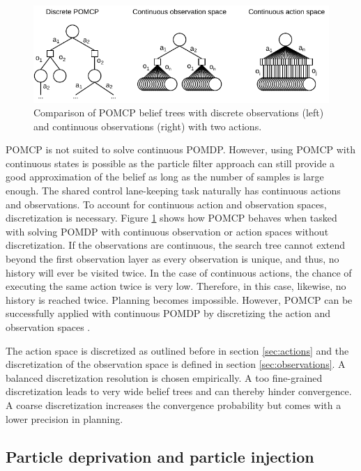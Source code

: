 \begin{figure}[htbp]
    \centering
    \includegraphics[width=1.0\textwidth]{figures/pomcp_continuous.pdf}
    \caption[Comparison of POMCP belief trees with discrete observations and continuous observations]{Comparison of POMCP belief trees with discrete observations (left) and continuous observations (right) with two actions.}
    \label{fig:pomcp_cont}
\end{figure}

POMCP is not suited to solve continuous POMDP. However, using POMCP with continuous states is possible as the particle filter approach can still provide a good approximation of the belief as long as the number of samples is large enough. The shared control lane-keeping task naturally has continuous actions and observations. To account for continuous action and observation spaces, discretization is necessary. Figure \ref{fig:pomcp_cont} shows how POMCP behaves when tasked with solving POMDP with continuous observation or action spaces without discretization. If the observations are continuous, the search tree cannot extend beyond the first observation layer as every observation is unique, and thus, no history will ever be visited twice. In the case of continuous actions, the chance of executing the same action twice is very low. Therefore, in this case, likewise, no history is reached twice. Planning becomes impossible. However, POMCP can be successfully applied with continuous POMDP by discretizing the action and observation spaces \parencite{pomcp_continuous}.

The action space is discretized as outlined before in section \ref{sec:actions} and the discretization of the observation space is defined in section \ref{sec:observations}. A balanced discretization resolution is chosen empirically. A too fine-grained discretization leads to very wide belief trees and can thereby hinder convergence. A coarse discretization increases the convergence probability but comes with a lower precision in planning.

\subsection{Particle deprivation and particle injection}
\label{sec:particle_deprivation}

